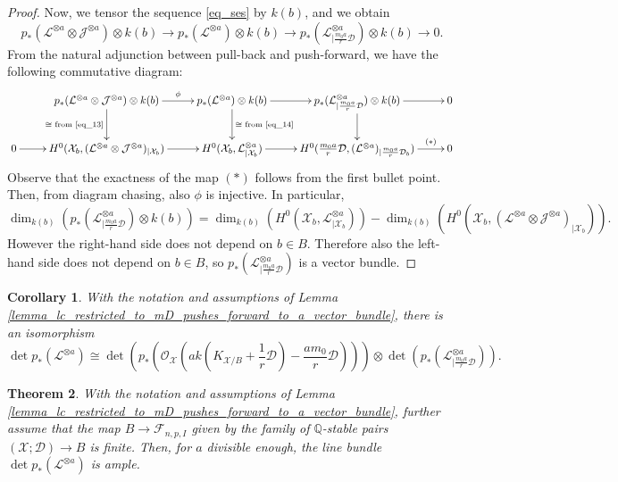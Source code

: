 \documentclass{amsart}
\newcommand{\bQ}{\mathbb{Q}}
\newcommand{\cJ}{\mathcal{J}}
\newcommand{\sF}{\mathscr{F}}
\newcommand{\cD}{\mathcal{D}}
\newcommand{\cL}{\mathcal{L}}
\newcommand{\cO}{\mathcal{O}}
\newcommand{\cX}{\mathcal{X}}
\newtheorem{theorem}{Theorem}[section]
\newtheorem{Cor}[theorem]{Corollary}
\theoremstyle{definition}
\begin{document}
\begin{proof}
Now, we tensor the sequence \eqref{eq_ses} by $k(b)$, and we obtain 
\[
     p_*(\cL^{\otimes a}\otimes \cJ^{\otimes a})\otimes k(b) \to p_*( \cL^{\otimes a})\otimes k(b) \to p_*(\cL_{|\frac{m_0a}{r}\cD}^{\otimes a})\otimes k(b)\to 0.
\]
From the natural adjunction between pull-back and push-forward, we have the following commutative diagram:
\[
\xymatrix{ & p_*(\cL^{\otimes a}\otimes \cJ^{\otimes a})\otimes k(b) \ar[d]_{\cong \text{ from \eqref{eq_13}}}\ar[r]^-\phi & p_*( \cL^{\otimes a})\otimes k(b) \ar[r] \ar[d]^{\cong \text{ from \eqref{eq_14}}} &p_*(\cL_{|\frac{m_0a}{r}\cD}^{\otimes a})\otimes k(b)\ar[r] \ar[d] & 0
\\ 0 \ar[r] & H^0( \cX_b, (\cL^{\otimes a}\otimes \cJ^{\otimes a})_{|\cX_b})\ar[r] & H^0(\cX_b, \cL^{\otimes a}_{|\cX_b}) \ar[r] & H^0(\frac{m_0a}{r}\cD, (\cL^{\otimes a})_{|\frac{m_0a}{r}\cD_b}) \ar[r]^-{(\ast)}& 0}
\]
Observe that the exactness of the map $(\ast)$ follows from the first bullet point.
Then, from diagram chasing, also $\phi$ is injective.
In particular,
\[
\dim_{k(b)}(p_*(\cL_{|\frac{m_0a}{r}\cD}^{\otimes a})\otimes k(b)) = \dim_{k(b)}(H^0(\cX_b, \cL^{\otimes a}_{|\cX_b})) - \dim_{k(b)}(H^0( \cX_b, (\cL^{\otimes a}\otimes \cJ^{\otimes a})_{|\cX_b})).
\]
However the right-hand side does not depend on $b\in B$. Therefore also the left-hand side does not depend on $b\in B$, so $p_*(\cL_{|\frac{m_0a}{r}\cD}^{\otimes a})$ is a vector bundle.
\end{proof}

\begin{Cor}\label{cor_determinant}
With the notation and assumptions of Lemma \ref{lemma_lc_restricted_to_mD_pushes_forward_to_a_vector_bundle}, there is an isomorphism
\[
\det p_*(\cL^{\otimes a}) \cong \det (p_*(\cO_{\cX}(ak(K_{\cX/B} + \frac{1}{r}\cD) - \frac{am_0}{r}\cD)))\otimes \det( p_*(\cL_{|\frac{m_0a}{r}\cD}^{\otimes a})).
\]
\end{Cor}

\begin{theorem}\label{thm:main:step:proj}
With the notation and assumptions of Lemma \ref{lemma_lc_restricted_to_mD_pushes_forward_to_a_vector_bundle}, further assume that the map $B\to \sF_{n,p,I}$ given by the
family of $\bQ$-stable pairs $(\cX;\cD)\to B$ is finite.
Then, for $a$ divisible enough, the line bundle $\det p_*(\cL^{\otimes a})$ is ample.
\end{theorem}
\end{document}
